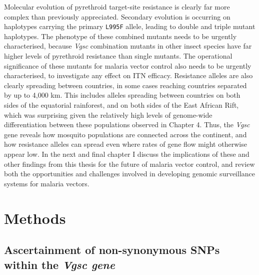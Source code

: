 \begin{refsection}
Molecular evolution of pyrethroid target-site resistance is clearly far more complex than previously appreciated.
%
Secondary evolution is occurring on haplotypes carrying the primary \texttt{L995F} allele, leading to double and triple mutant haplotypes.
%
The phenotype of these combined mutants needs to be urgently characterised, because \textit{Vgsc} combination mutants in other insect species have far higher levels of pyrethroid resistance than single mutants.
%
The operational significance of these mutants for malaria vector control also needs to be urgently characterised, to investigate any effect on ITN efficacy.
%
Resistance alleles are also clearly spreading between countries, in some cases reaching countries separated by up to 4,000 km.
%
This includes alleles spreading between countries on both sides of the equatorial rainforest, and on both sides of the East African Rift, which was surprising given the relatively high levels of genome-wide differentiation between these populations observed in Chapter 4.
%
Thus, the \textit{Vgsc} gene reveals how mosquito populations are connected across the continent, and how resistance alleles can spread even where rates of gene flow might otherwise appear low.
%
In the next and final chapter I discuss the implications of these and other findings from this thesis for the future of malaria vector control, and review both the opportunities and challenges involved in developing genomic surveillance systems for malaria vectors.


\section{Methods}\label{sec:ch6-methods}


\subsection{Ascertainment of non-synonymous SNPs within the \textit{Vgsc gene}}\label{subsec:methods-asc}



\end{refsection}
